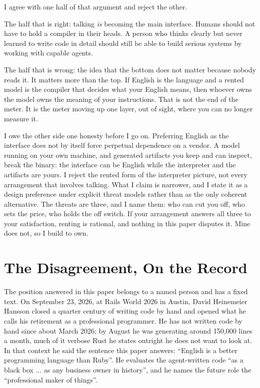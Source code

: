 \documentclass[11pt]{article}
\begin{document}
I agree with one half of that argument and reject the other.

The half that is right: talking \emph{is} becoming the main interface.
Humans should not have to hold a compiler in their heads. A person who
thinks clearly but never learned to write code in detail should still
be able to build serious systems by working with capable agents.

The half that is wrong: the idea that the bottom does not matter
because nobody reads it. It matters more than the top. If English is
the language and a rented model is the compiler that decides what your
English means, then whoever owns the model owns the meaning of your
instructions. That is not the end of the meter. It is the meter moving up one layer,
out of sight, where you can no longer measure it.

I owe the other side one honesty before I go on. Preferring English as
the interface does not by itself force perpetual dependence on a
vendor. A model running on your own machine, and generated artifacts
you keep and can inspect, break the binary: the interface can be
English while the interpreter and the artifacts are yours. I reject
the rented form of the interpreter picture, not every arrangement that
involves talking. What I claim is narrower, and I state it as a design
preference under explicit threat models rather than as the only
coherent alternative. The threats are three, and I name them: who can
cut you off, who sets the price, who holds the off switch. If your
arrangement answers all three to your satisfaction, renting is
rational, and nothing in this paper disputes it. Mine does not, so I
build to own.

\section{The Disagreement, On the Record}

The position answered in this paper belongs to a named person and has
a fixed text. On September 23, 2026, at Rails World 2026 in Austin,
David Heinemeier Hansson closed a quarter century of writing code by
hand and opened what he calls his retirement as a professional
programmer. He has not written code by hand since about March 2026;
by August he was generating around 150,000 lines a month, much of it
verbose Rust he states outright he does not want to look at. In that
context he said the sentence this paper answers: ``English is a better
programming language than Ruby''\cite{dhh-keynote}. He evaluates the
agent-written code ``as a black box ... as any business owner in
history''\cite{dhh-keynote}, and he names the future role the
``professional maker of things''\cite{dhh-keynote}.
\end{document}
